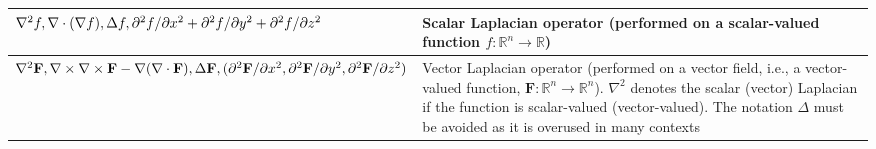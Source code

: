 \begin{xltabular}{\textwidth}{XX}
	\(\nabla^2 f, \nabla \cdot (\nabla f), \Delta f, \newline \partial^2f/\partial x^2 + \partial^2f/\partial y^2 + \partial^2f/\partial z^2\)                                                                                                 & Scalar Laplacian operator (performed on a scalar-valued function \(f: \mathbb{R}^{n} \rightarrow \mathbb{R}\))                                                                                                                                                                                                                      \\ \hline
	\(\nabla^2 \mathbf{F}, \nabla \times \nabla \times \mathbf{F} - \nabla(\nabla \cdot \mathbf{F}), \Delta \mathbf{F}, \newline (\partial^2\mathbf{F}/\partial x^2 , \partial^2\mathbf{F}/\partial y^2 , \partial^2\mathbf{F}/\partial z^2)\) & Vector Laplacian operator (performed on a vector field, i.e., a vector-valued function, \(\mathbf{F}: \mathbb{R}^{n} \rightarrow \mathbb{R}^{n}\)). \(\nabla^2\) denotes the scalar (vector) Laplacian if the function is scalar-valued (vector-valued). The notation \(\Delta\) must be avoided as it is overused in many contexts \\
\end{xltabular}
